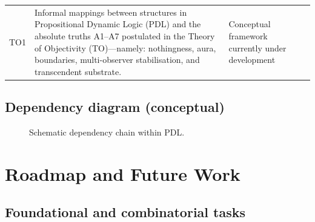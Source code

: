 \documentclass{article}
\begin{document}
\begin{longtable}{@{}p{0.7cm}p{7cm}L{5.6cm}p{2cm}@{}}
  TO1 &
  Informal mappings between structures in Propositional Dynamic Logic (PDL) and the absolute truths A1–A7 postulated in the Theory of Objectivity (TO)—namely: nothingness, aura, boundaries, multi-observer stabilisation, and transcendent substrate. &
  Conceptual framework currently under development & \cite{PDL_TO_dialogue,PDL_position} \\

\end{longtable}

\subsection{Dependency diagram (conceptual)}

\begin{figure}[H]
  \centering
  \caption{Schematic dependency chain within PDL.}
  \label{fig:dependency}
\end{figure}

\section{Roadmap and Future Work}
\label{sec:roadmap}

\subsection{Foundational and combinatorial tasks}
\label{subsec:roadmap_foundational}
\end{document}
